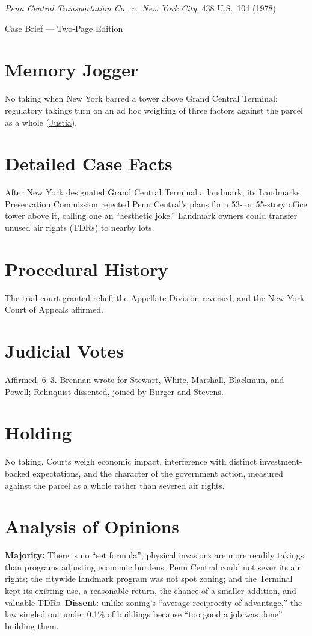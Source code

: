 \documentclass[12pt]{article}
\begin{document}
\begin{center}
{\LARGE \textit{Penn Central Transportation Co.\ v.\ New York City}, 438 U.S.\ 104 (1978)\par}
\vspace{0.5em}
{\large Case Brief --- Two-Page Edition\par}
\end{center}

\section{Memory Jogger}
No taking when New York barred a tower above Grand Central Terminal; regulatory takings turn on an ad hoc weighing of three factors against the parcel as a whole (\href{https://supreme.justia.com/cases/federal/us/438/104/}{Justia}).

\section{Detailed Case Facts}
After New York designated Grand Central Terminal a landmark, its Landmarks Preservation Commission rejected Penn Central's plans for a 53- or 55-story office tower above it, calling one an ``aesthetic joke.'' Landmark owners could transfer unused air rights (TDRs) to nearby lots.

\section{Procedural History}
The trial court granted relief; the Appellate Division reversed, and the New York Court of Appeals affirmed.

\section{Judicial Votes}
Affirmed, 6--3. Brennan wrote for Stewart, White, Marshall, Blackmun, and Powell; Rehnquist dissented, joined by Burger and Stevens.

\section{Holding}
No taking. Courts weigh economic impact, interference with distinct investment-backed expectations, and the character of the government action, measured against the parcel as a whole rather than severed air rights.

\section{Analysis of Opinions}
\textbf{Majority:} There is no ``set formula''; physical invasions are more readily takings than programs adjusting economic burdens. Penn Central could not sever its air rights; the citywide landmark program was not spot zoning; and the Terminal kept its existing use, a reasonable return, the chance of a smaller addition, and valuable TDRs. \textbf{Dissent:} unlike zoning's ``average reciprocity of advantage,'' the law singled out under 0.1\% of buildings because ``too good a job was done'' building them.
\end{document}
